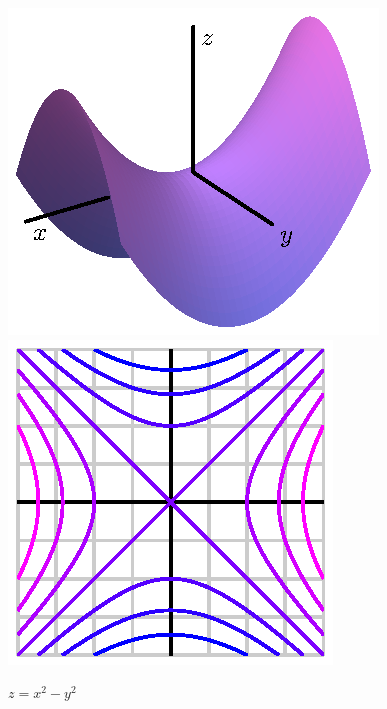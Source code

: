 \begin{figure}[ht]
  \begin{center}
    \includegraphics{figures/saddle.eps}
    \hspace*{30pt}
    \includegraphics{figures/saddle_contours.eps}
  \end{center}
  \caption{$z=x^2-y^2$}
\end{figure}
